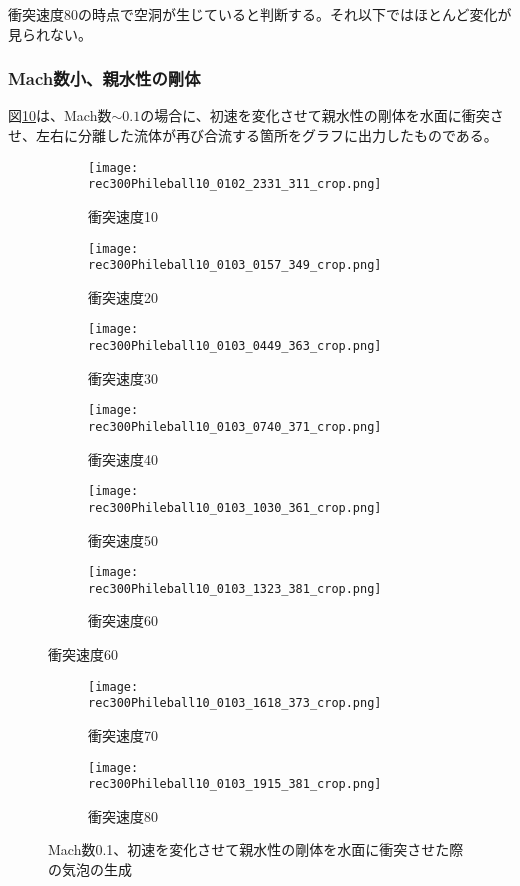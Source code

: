 \documentclass[]{jsarticle}
\begin{document}
衝突速度80の時点で空洞が生じていると判断する。それ以下ではほとんど変化が見られない。
\subsubsection{Mach数小、親水性の剛体}
図\ref{fig:MachSPhile}は、Mach数$\sim0.1$の場合に、初速を変化させて親水性の剛体を水面に衝突させ、左右に分離した流体が再び合流する箇所をグラフに出力したものである。
\begin{figure}[H]
  \centering
\begin{subfigure}{0.3\columnwidth}
  \centering
  \texttt{[image: rec300Phileball10\_0102\_2331\_311\_crop.png]}
  \caption{衝突速度10}
  \label{fig:MLPhilevel10}
\end{subfigure}
\begin{subfigure}{0.3\columnwidth}
  \centering
  \texttt{[image: rec300Phileball10\_0103\_0157\_349\_crop.png]}
  \caption{衝突速度20}
  \label{fig:MLPhilevel20}
\end{subfigure}
\begin{subfigure}{0.3\columnwidth}
  \centering
  \texttt{[image: rec300Phileball10\_0103\_0449\_363\_crop.png]}
  \caption{衝突速度30}
  \label{fig:MLPhilevel30}
\end{subfigure}
\begin{subfigure}{0.3\columnwidth}
  \centering
  \texttt{[image: rec300Phileball10\_0103\_0740\_371\_crop.png]}
  \caption{衝突速度40}
  \label{fig:MLPhilevel40}
\end{subfigure}
\begin{subfigure}{0.3\columnwidth}
  \centering
  \texttt{[image: rec300Phileball10\_0103\_1030\_361\_crop.png]}
  \caption{衝突速度50}
  \label{fig:MLPhilevel50}
\end{subfigure}
\begin{subfigure}{0.3\columnwidth}
  \centering
  \texttt{[image: rec300Phileball10\_0103\_1323\_381\_crop.png]}
  \caption{衝突速度60}
  \label{fig:MLPhilevel60}
\end{subfigure}
\end{figure}
\clearpage
\begin{figure}
\ContinuedFloat
  \begin{subfigure}{0.3\columnwidth}
  \centering
  \texttt{[image: rec300Phileball10\_0103\_1618\_373\_crop.png]}
  \caption{衝突速度70}
  \label{fig:MLPhilevel70}
\end{subfigure}
\begin{subfigure}{0.3\columnwidth}
  \centering
  \texttt{[image: rec300Phileball10\_0103\_1915\_381\_crop.png]}
  \caption{衝突速度80}
  \label{fig:MLPhilevel80}
\end{subfigure}
\caption{Mach数0.1、初速を変化させて親水性の剛体を水面に衝突させた際の気泡の生成}
\label{fig:MachSPhile}
\end{figure}
\end{document}

